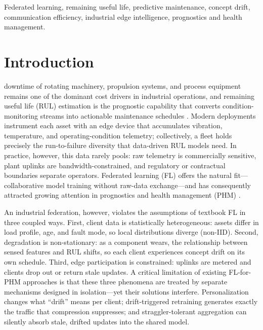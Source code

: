 \documentclass[journal]{IEEEtran}
\begin{document}
\begin{IEEEkeywords}
Federated learning, remaining useful life, predictive maintenance, concept drift, communication efficiency, industrial edge intelligence, prognostics and health management.
\end{IEEEkeywords}

\section{Introduction}
 downtime of rotating machinery, propulsion systems, and process equipment remains one of the dominant cost drivers in industrial operations, and remaining useful life (RUL) estimation is the prognostic capability that converts condition-monitoring streams into actionable maintenance schedules \cite{saxena2008,heimes2008,zheng2017,li2018,asif2022}. Modern deployments instrument each asset with an edge device that accumulates vibration, temperature, and operating-condition telemetry; collectively, a fleet holds precisely the run-to-failure diversity that data-driven RUL models need. In practice, however, this data rarely pools: raw telemetry is commercially sensitive, plant uplinks are bandwidth-constrained, and regulatory or contractual boundaries separate operators. Federated learning (FL) \cite{mcmahan2017} offers the natural fit---collaborative model training without raw-data exchange---and has consequently attracted growing attention in prognostics and health management (PHM) \cite{chen2023ghdr,chen2023pruning,vermelin2024,chen2024bearing,jeong2025fedjoint}.

An industrial federation, however, violates the assumptions of textbook FL in three coupled ways. First, client data is statistically heterogeneous: assets differ in load profile, age, and fault mode, so local distributions diverge (non-IID). Second, degradation is non-stationary: as a component wears, the relationship between sensed features and RUL shifts, so each client experiences concept drift on its own schedule. Third, edge participation is constrained: uplinks are metered and clients drop out or return stale updates. A critical limitation of existing FL-for-PHM approaches is that these three phenomena are treated by separate mechanisms designed in isolation---yet their solutions interfere. Personalization changes what ``drift'' means per client; drift-triggered retraining generates exactly the traffic that compression suppresses; and straggler-tolerant aggregation can silently absorb stale, drifted updates into the shared model.
\end{document}
